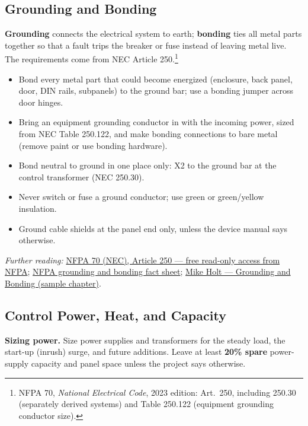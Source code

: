 \subsection{Grounding and Bonding}\label{sec:bonding}
\textbf{Grounding} connects the electrical system to earth; \textbf{bonding} ties all metal parts together so that a fault trips the breaker or fuse instead of leaving metal live. The requirements come from NEC Article 250.\footnote{NFPA 70, \emph{National Electrical Code}, 2023 edition: Art.~250, including 250.30 (separately derived systems) and Table 250.122 (equipment grounding conductor size).}
\begin{itemize}[itemsep=2pt]
  \item Bond every metal part that could become energized (enclosure, back panel, door, DIN rails, subpanels) to the ground bar; use a bonding jumper across door hinges.
  \item Bring an equipment grounding conductor in with the incoming power, sized from NEC Table 250.122, and make bonding connections to bare metal (remove paint or use bonding hardware).
  \item Bond neutral to ground in one place only: X2 to the ground bar at the control transformer (NEC 250.30).
  \item Never switch or fuse a ground conductor; use green or green/yellow insulation.
  \item Ground cable shields at the panel end only, unless the device manual says otherwise.
\end{itemize}
\textit{Further reading:} \href{https://link.nfpa.org/all-publications/70/2023}{NFPA 70 (NEC), Article 250 --- free read-only access from NFPA}; \href{https://www.nfpa.org/forms/grounding-and-bonding-fact-sheet}{NFPA grounding and bonding fact sheet}; \href{https://www.mikeholt.com/instructor2/img/product/pdf/1292448885sample.pdf}{Mike Holt --- Grounding and Bonding (sample chapter)}.

\subsection{Control Power, Heat, and Capacity}\label{sec:heat}
\textbf{Sizing power.} Size power supplies and transformers for the steady load, the start-up (inrush) surge, and future additions. Leave at least \textbf{20\% spare} power-supply capacity and panel space unless the project says otherwise.

